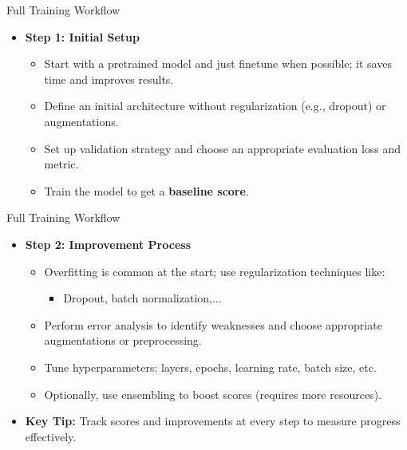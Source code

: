 \begin{frame}{Full Training Workflow}
\begin{itemize}
    \item \textbf{Step 1: Initial Setup}
    \begin{itemize}
        \item Start with a pretrained model and just finetune when possible; it saves time and improves results.
        \item Define an initial architecture without regularization (e.g., dropout) or augmentations.
        \item Set up validation strategy and choose an appropriate evaluation loss and metric.
        \item Train the model to get a \textbf{baseline score}.
    \end{itemize}
\end{itemize}
\end{frame}

\begin{frame}{Full Training Workflow}
\begin{itemize}
    \item \textbf{Step 2: Improvement Process}
    \begin{itemize}
        \item Overfitting is common at the start; use regularization techniques like:
        \begin{itemize}
            \item Dropout, batch normalization,...
        \end{itemize}
        \item Perform error analysis to identify weaknesses and choose appropriate augmentations or preprocessing.
        \item Tune hyperparameters: layers, epochs, learning rate, batch size, etc.
        \item Optionally, use ensembling to boost scores (requires more resources).
    \end{itemize}
    \item \textbf{Key Tip:} Track scores and improvements at every step to measure progress effectively.
\end{itemize}
\end{frame}

